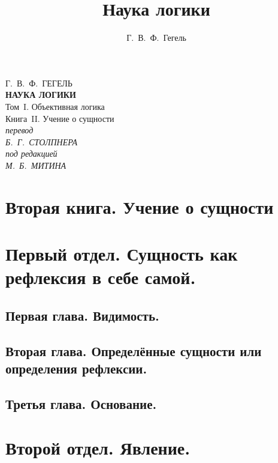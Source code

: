 \documentclass[b5paper, 11pt, twoside, onecolumn, openany]{memoir}
\author{Г.~В.~Ф.~Гегель}
\title{Наука логики}
\date{}
\begin{document}
\frontmatter
\pagestyle{empty}

{\centering
  {\Large Г.~В.~Ф.~ГЕГЕЛЬ} \\
  \vspace{130pt}
  \textbf{\Huge НАУКА ЛОГИКИ} \\
  \vspace{12pt}
  {\Large Том~I. Объективная логика} \\
  \vspace{8pt}
  {\large Книга~II. Учение о сущности} \\
  \vspace{45pt}
  \textit{перевод} \\
  \textit{Б.~Г.~СТОЛПНЕРА} \\
  \vspace{10pt}
  \textit{под редакцией} \\
  \textit{М.~Б.~МИТИНА}
\par}

\clearpage

\mainmatter
\pagestyle{plain}

\part[Вторая книга \\ УЧЕНИЕ О СУЩНОСТИ]{Вторая книга. Учение о сущности}
\part[{\em Первый отдел} СУЩНОСТЬ КАК РЕФЛЕКСИЯ В СЕБЕ САМОЙ]{Первый отдел. Сущность как рефлексия в себе самой.}
\chapter*{Первая глава. Видимость.}


\chapter*{Вторая глава. Определённые сущности или определения рефлексии.}


\chapter*{Третья глава. Основание.}


\part*{Второй отдел. Явление.}
\end{document}
